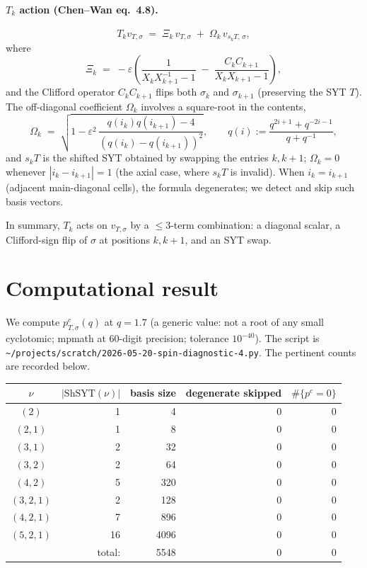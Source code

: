 \documentclass[11pt]{article}
\newcommand{\Om}{\Omega}
\newcommand{\Xih}{\Xi}
\newcommand{\ShSYT}{\mathrm{ShSYT}}
\begin{document}
\paragraph{$T_k$ action (Chen--Wan eq.~4.8).}
\begin{equation}
\label{eq:CW48}
T_k v_{T,\sigma}
\;=\;
\Xih_k\, v_{T,\sigma}
\;+\;
\Om_k\, v_{s_k T,\, \sigma},
\end{equation}
where
\[
\Xih_k \;=\; -\varepsilon \left(
\frac{1}{X_k X_{k+1}^{-1} - 1}
\;-\;
\frac{C_k C_{k+1}}{X_k X_{k+1} - 1}
\right),
\]
and the Clifford operator $C_k C_{k+1}$ flips both $\sigma_k$ and
$\sigma_{k+1}$ (preserving the SYT $T$). The off-diagonal coefficient
$\Om_k$ involves a square-root in the contents,
\[
\Om_k \;=\; \sqrt{
1 - \varepsilon^{2}\,
\frac{q(i_k) q(i_{k+1}) - 4}{(q(i_k) - q(i_{k+1}))^{2}}
},
\qquad
q(i) := \frac{q^{2i+1} + q^{-2i-1}}{q + q^{-1}},
\]
and $s_k T$ is the shifted SYT obtained by swapping the entries $k, k+1$;
$\Om_k = 0$ whenever $|i_k - i_{k+1}| = 1$ (the axial case, where $s_k T$
is invalid). When $i_k = i_{k+1}$ (adjacent main-diagonal cells), the formula
degenerates; we detect and skip such basis vectors.

In summary, $T_k$ acts on $v_{T,\sigma}$ by a $\le 3$-term combination:
a diagonal scalar, a Clifford-sign flip of $\sigma$ at positions $k,k+1$, and
an SYT swap.

\section{Computational result}

We compute $p^{c}_{T,\sigma}(q)$ at $q = 1.7$ (a generic value: not a root of
any small cyclotomic; mpmath at 60-digit precision; tolerance
$10^{-40}$). The script is
\verb|~/projects/scratch/2026-05-20-spin-diagnostic-4.py|.
The pertinent counts are recorded below.

\begin{center}
\renewcommand{\arraystretch}{1.1}
\begin{tabular}{|c|r|r|r|r|}
\hline
$\nu$ & $|\ShSYT(\nu)|$ & basis size & degenerate skipped & $\#\{p^{c}=0\}$ \\
\hline
$(2)$       & 1   & 4    & 0   & 0 \\
$(2,1)$     & 1   & 8    & 0   & 0 \\
$(3,1)$     & 2   & 32   & 0   & 0 \\
$(3,2)$     & 2   & 64   & 0   & 0 \\
$(4,2)$     & 5   & 320  & 0   & 0 \\
$(3,2,1)$   & 2   & 128  & 0   & 0 \\
$(4,2,1)$   & 7   & 896  & 0   & 0 \\
$(5,2,1)$   & 16  & 4096 & 0   & 0 \\
\hline
\multicolumn{2}{|r|}{total:} & 5548 & 0 & 0 \\
\hline
\end{tabular}
\end{center}
\end{document}
